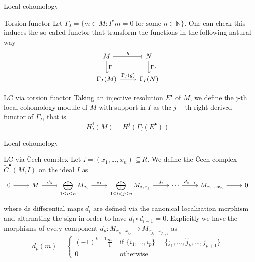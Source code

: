 \documentclass{beamer}
\begin{document}
\begin{frame}[fragile]{Local cohomology}
  \begin{block}{Torsion functor}
Let $\Gamma_I= \{m\in M : I^nm = 0 \text{ for some }n\in \mathbb{N} \}$. One can check this induces the so-called functor that transform the functions in the following natural way
\[\begin{tikzcd}
	M & N \\
	{\Gamma_I(M)} & {\Gamma_I(N)}
	\arrow["{\Gamma_I}", from=1-1, to=2-1]
	\arrow["{\Gamma_I}", from=1-2, to=2-2]
	\arrow["g", from=1-1, to=1-2]
	\arrow["{\Gamma_I(g)}", from=2-1, to=2-2]
\end{tikzcd}\]
  \end{block}
  \begin{block}{LC via torsion functor}
Taking an injective resolution $E^\bullet$ of $M$, we define the j-th local cohomology module of $M$ with support in  $I$ as the  $j-$th right derived functor of $\Gamma_I $, that is
\[
H_I^j(M)=H^j(\Gamma _I (E^\bullet) )
\] 
\end{block}
\end{frame}


\begin{frame}[fragile]{Local cohomology}
  \begin{block}{LC via \v{C}ech complex}
Let $I=(x_1, \ldots, x_n)\subseteq R$. We define the \v{C}ech complex $\check{C}^{\bullet}(M, I)$ on the ideal $I$ as
\[\begin{tikzcd}
	0 & M & {\displaystyle{\bigoplus_{1\le i\le n} M_{x_i}}} & {\displaystyle{\bigoplus_{1\le i<j\le n} M_{x_ix_j}}} & \cdots & {M_{x_1\cdots x_n}} & 0
	\arrow[from=1-1, to=1-2]
	\arrow["{d_0}", from=1-2, to=1-3]
	\arrow["{d_1}", from=1-3, to=1-4]
	\arrow["{d_2}", from=1-4, to=1-5]
	\arrow["{d_{n-1}}", from=1-5, to=1-6]
	\arrow[from=1-6, to=1-7]
\end{tikzcd}\]
where de differential maps $d_i$ are defined via the canonical localization morphism and alternating the sign in order to have $d_i\circ d_{i-1}=0$. Explicitly we have the morphisms of every component $d_p: M_{x_{i_1}\cdots x_{i_p}} \to M_{x_{j_1}\cdots x_{j_{p+1}}}$ as
\[
  d_p(m) = \begin{cases}
	(-1)^{k+1} \frac{m}{1} &\text{ if } \{i_1, \ldots, i_p\} = \{j_1, \ldots, \hat{j}_k,\ldots, j_{p+1}\}\\ 0 &\text{ otherwise}
  \end{cases}
\] 
\end{block}
\end{frame}
\end{document}
